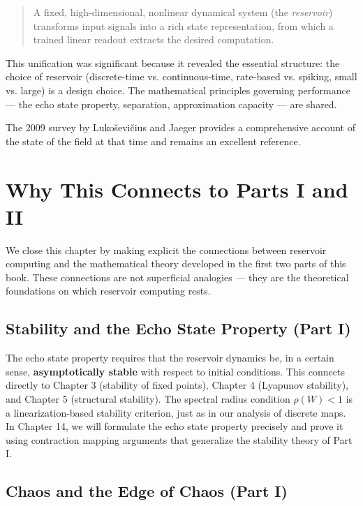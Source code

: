\begin{quote}
A fixed, high-dimensional, nonlinear dynamical system (the \textit{reservoir}) transforms input signals into a rich state representation, from which a trained linear readout extracts the desired computation.
\end{quote}

This unification was significant because it revealed the essential structure: the choice of reservoir (discrete-time vs. continuous-time, rate-based vs. spiking, small vs. large) is a design choice. The mathematical principles governing performance --- the echo state property, separation, approximation capacity --- are shared.

The 2009 survey by Lukoševičius and Jaeger provides a comprehensive account of the state of the field at that time and remains an excellent reference.


\bigskip


\section{Why This Connects to Parts I and II}\label{sec:13.6}

We close this chapter by making explicit the connections between reservoir computing and the mathematical theory developed in the first two parts of this book. These connections are not superficial analogies --- they are the theoretical foundations on which reservoir computing rests.

\subsection{Stability and the Echo State Property (Part I)}\label{sec:13.6.1}

The echo state property requires that the reservoir dynamics be, in a certain sense, \textbf{asymptotically stable} with respect to initial conditions. This connects directly to Chapter 3 (stability of fixed points), Chapter 4 (Lyapunov stability), and Chapter 5 (structural stability). The spectral radius condition $\rho(W) < 1$ is a linearization-based stability criterion, just as in our analysis of discrete maps. In Chapter 14, we will formulate the echo state property precisely and prove it using contraction mapping arguments that generalize the stability theory of Part I.

\subsection{Chaos and the Edge of Chaos (Part I)}\label{sec:13.6.2}

